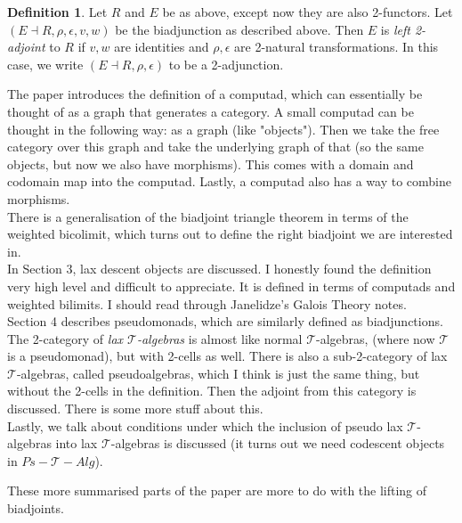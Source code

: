 \documentclass{article}
\numberwithin{equation}{section}
\theoremstyle{definition}
\theoremstyle{definition}
\newtheorem{defn}[thm]{Definition}
\theoremstyle{remark}
\theoremstyle{remark}
\begin{document}
	\begin{defn}
		Let $ R$ and $ E$ be as above, except now they are also 2-functors. Let $ (E \dashv R, \rho, \epsilon, v, w) $ be the biadjunction as described above. 
		Then $ E$ is \textit{left 2-adjoint} to $ R$ if $ v,w$ are identities and $ \rho, \epsilon$ are 2-natural transformations. 
		In this case, we write $ (E \dashv R, \rho, \epsilon)$ to be a 2-adjunction.
	\end{defn} 
	
	The paper introduces the definition of a computad, which can essentially be thought of as a graph that generates a category. 
	A small computad can be thought in the following way: as a graph (like "objects"). 
	Then we take the free category over this graph and take the underlying graph of that (so the same objects, but now we also have morphisms). This comes with a domain and codomain map into the computad.
	Lastly, a computad also has a way to combine morphisms. \\

	There is a generalisation of the biadjoint triangle theorem in terms of the weighted bicolimit, which turns out to define the right biadjoint we are interested in.\\

	In Section 3, lax descent objects are discussed. 
	I honestly found the definition very high level and difficult to appreciate. It is defined in terms of computads and weighted bilimits.
	I should read through Janelidze's Galois Theory notes.\\


	Section 4 describes pseudomonads, which are similarly defined as biadjunctions.
	The 2-category of \textit{lax $ \mathcal{T}$-algebras} is almost like normal $ \mathcal{T}$-algebras, (where now $ \mathcal{T}$ is a pseudomonad), but with 2-cells as well.
	There is also a sub-2-category of lax $ \mathcal{T}$-algebras, called pseudoalgebras, which I think is just the same thing, but without the 2-cells in the definition.
	Then the adjoint from this category is discussed.
	There is some more stuff about this.\\

	Lastly, we talk about conditions under which the inclusion of pseudo lax $ \mathcal{T}$-algebras into lax $ \mathcal{T} $-algebras is discussed (it turns out we need codescent objects in $Ps- \mathcal{T}-Alg$).

	These more summarised parts of the paper are more to do with the lifting of biadjoints.
	
\end{document}
